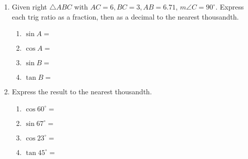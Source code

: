 \begin{enumerate}
\item Given right $\triangle ABC$ with $AC=6, BC=3, AB=6.71$, $m\angle C=90^\circ$. Express each trig ratio as a fraction, then as a decimal to the nearest thousandth.
\begin{center}
   \vspace{.1cm}
\end{center}
\begin{multicols}{2}
  \begin{enumerate}
    \item $\sin A = $ \vspace{1cm}
    \item $\cos A =$
    \item $\sin B = $ \vspace{1cm}
    \item $\tan B =$
  \end{enumerate}
\end{multicols}

\item Express the result to the nearest thousandth.  \vspace{.5cm}
  \begin{multicols}{2}
    \begin{enumerate}
      \item $\cos 60^\circ = $ \vspace{1cm}
      \item $\sin 67^\circ =$
      \item $\cos 23^\circ = $ \vspace{1cm}
      \item $\tan 45^\circ =$
    \end{enumerate}
  \end{multicols} \vspace{1cm}


\end{enumerate}
